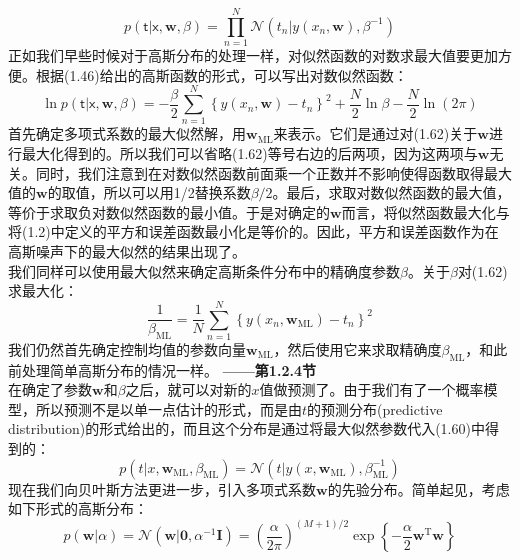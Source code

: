 \documentclass[b5paper]{book}
\numberwithin{equation}{chapter}
\begin{document}
{	\begin{equation}
		p(\boldsymbol{\mathsf{t}}|\boldsymbol{\mathsf{x}},\mathbf{w},\beta) = \prod_{n=1}^{N}\mathcal{N}(t_n|y(x_n,\mathbf{w}),\beta^{-1})
	\end{equation}
	\indent 正如我们早些时候对于高斯分布的处理一样，对似然函数的对数求最大值要更加方便。根据(1.46)给出的高斯函数的形式，可以写出对数似然函数：
	\begin{equation}
		\ln p(\boldsymbol{\mathsf{t}}|\boldsymbol{\mathsf{x}},\mathbf{w},\beta)=-\frac{\beta}{2}\sum_{n=1}^{N}\left\{y(x_n,\mathbf{w})-t_n\right\}^2 + \frac{N}{2}\ln \beta - \frac{N}{2}\ln(2\pi)
	\end{equation}
	\indent 首先确定多项式系数的最大似然解，用$\mathbf{w}_\mathrm{ML}$来表示。它们是通过对(1.62)关于$\mathbf{w}$进行最大化得到的。所以我们可以省略(1.62)等号右边的后两项，因为这两项与$\mathbf{w}$无关。同时，我们注意到在对数似然函数前面乘一个正数并不影响使得函数取得最大值的$\mathbf{w}$的取值，所以可以用1/2替换系数$\beta/2$。最后，求取对数似然函数的最大值，等价于求取负对数似然函数的最小值。于是对确定的$\mathbf{w}$而言，将似然函数最大化与将(1.2)中定义的平方和误差函数最小化是等价的。因此，平方和误差函数作为在高斯噪声下的最大似然的结果出现了。\\
	\indent 我们同样可以使用最大似然来确定高斯条件分布中的精确度参数$\beta$。关于$\beta$对(1.62)求最大化：
	\begin{equation}
		\frac{1}{\beta_\mathrm{ML}} = \frac{1}{N}\sum_{n=1}^{N}\left\{y(x_n,\mathbf{w}_\mathrm{ML})-t_n\right\}^2
	\end{equation}
	\indent 我们仍然首先确定控制均值的参数向量$\mathbf{w}_\mathrm{ML}$，然后使用它来求取精确度$\beta_\mathrm{ML}$，和此前处理简单高斯分布的情况一样。\color{red} \textbf{——第1.2.4节}　\color{black}\\
	\indent 在确定了参数$\mathbf{w}$和$\beta$之后，就可以对新的$x$值做预测了。由于我们有了一个概率模型，所以预测不是以单一点估计的形式，而是由$t$的预测分布(predictive distribution)的形式给出的，而且这个分布是通过将最大似然参数代入(1.60)中得到的：
	\begin{equation}
		p(t|x,\mathbf{w}_\mathrm{ML},\beta_\mathrm{ML})=\mathcal{N}(t|y(x,\mathbf{w}_\mathrm{ML}),\beta_\mathrm{ML}^{-1})
	\end{equation}
	\indent 现在我们向贝叶斯方法更进一步，引入多项式系数$\mathbf{w}$的先验分布。简单起见，考虑如下形式的高斯分布：
	\begin{equation}
		p(\mathbf{w}|\alpha)=\mathcal{N}(\mathbf{w}|\mathbf{0},\alpha^{-1}\mathbf{I})=\left(\frac{\alpha}{2\pi}\right)^{(M+1)/2}\exp\left\{-\frac{\alpha}{2}\mathbf{w}^\mathrm{T}\mathbf{w}\right\}

\end{equation}}
\end{document}
